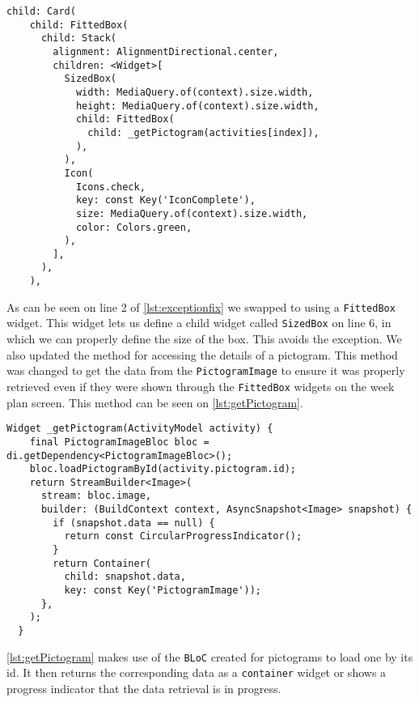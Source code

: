 \begin{lstlisting}[caption={An excerpt showing the use of FittedBox instead of PictogramImage},label={lst:exceptionfix},language={[Sharp]C}]
  child: Card(
    child: FittedBox(
      child: Stack(
        alignment: AlignmentDirectional.center,
        children: <Widget>[
          SizedBox(
            width: MediaQuery.of(context).size.width,
            height: MediaQuery.of(context).size.width,
            child: FittedBox(
              child: _getPictogram(activities[index]),
            ),
          ),
          Icon(
            Icons.check,
            key: const Key('IconComplete'),
            size: MediaQuery.of(context).size.width,
            color: Colors.green,
          ),
        ],
      ),
    ),
\end{lstlisting}
As can be seen on line 2 of \autoref{lst:exceptionfix} we swapped to using a \texttt{FittedBox} widget. This widget lets us define a child widget called \texttt{SizedBox} on line 6, in which we can properly define the size of the box. This avoids the exception.
We also updated the method for accessing the details of a pictogram.
This method was changed to get the data from the \texttt{PictogramImage} to ensure it was properly retrieved even if they were shown through the \texttt{FittedBox} widgets on the week plan screen.
This method can be seen on \autoref{lst:getPictogram}.
\begin{lstlisting}[caption={The getPictogram method to retrieve the details of a pictogram},label={lst:getPictogram},language={[Sharp]C}]
  Widget _getPictogram(ActivityModel activity) {
    final PictogramImageBloc bloc = di.getDependency<PictogramImageBloc>();
    bloc.loadPictogramById(activity.pictogram.id);
    return StreamBuilder<Image>(
      stream: bloc.image,
      builder: (BuildContext context, AsyncSnapshot<Image> snapshot) {
        if (snapshot.data == null) {
          return const CircularProgressIndicator();
        }
        return Container(
          child: snapshot.data, 
          key: const Key('PictogramImage'));
      },
    );
  }
\end{lstlisting}
\autoref{lst:getPictogram} makes use of the \texttt{BLoC} created for pictograms to load one by its id.
It then returns the corresponding data as a \texttt{container} widget or shows a progress indicator that the data retrieval is in progress.
